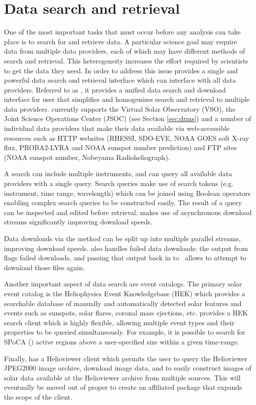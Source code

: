 \section{Data search and retrieval}
\label{sec:fido}

One of the most important tasks that must occur before any analysis can take place is to search for and retrieve data.
A particular science goal may require data from multiple data providers, each of which may have different methods of search and retrieval.
This heterogeneity increases the effort required by scientists to get the data they need.
In order to address this issue \sunpypkg provides a single and powerful data search and retrieval interface which can interface with all data providers.
Referred to as \Fido, it provides a unified data search and download interface for user that simplifies and homogenizes search and retrieval to multiple data providers.
\Fido currently supports the Virtual Solar Observatory (VSO), the Joint Science Operations Center (JSOC) (see Section \ref{sec:drms}) and a number of individual data providers that make their data available via web-accessible resources such as HTTP websites (RHESSI, SDO-EVE, NOAA GOES soft X-ray flux, PROBA2-LYRA and NOAA sunspot number prediction) and FTP sites (NOAA sunspot number, Nobeyama Radioheliograph).

A \Fido search can include multiple instruments, and can query all available data providers with a single query.
Search queries make use of search tokens (e.g. instrument, time range, wavelength) which can be joined using Boolean operators enabling complex search queries to be constructed easily.
The result of a query can be inspected and edited before retrieval.
\Fido makes use of asynchronous download streams significantly improving download speeds.

Data downloads via the  method can be split up into multiple parallel streams, improving download speeds.
\Fido also handles failed data downloads: the output from  flags failed downloads, and passing that output back in to \ allows \Fido to attempt to download those files again.

Another important aspect of data search are event catalogs.
The primary solar event catalog is the Heliophysics Event Knowledgebase (HEK) which provides a searchable database of manually and automatically detected solar features and events such as sunspots, solar flares, coronal mass ejections, etc.  \sunpypkg provides a HEK search client which is highly flexible, allowing multiple event types and their properties to be queried simultaneously.
For example, it is possible to search for SPoCA (\cite{2014AA...561A..29V}) active regions above a user-specified size within a given time-range.

Finally, \sunpy has a Helioviewer client which permits the user to query the Helioviewer JPEG2000 image archive, download image data, and to easily construct images of solar data available at the Helioviewer archive from multiple sources.
This will eventually  be moved out of \sunpy proper to create an affiliated package that expands the scope of the client.
